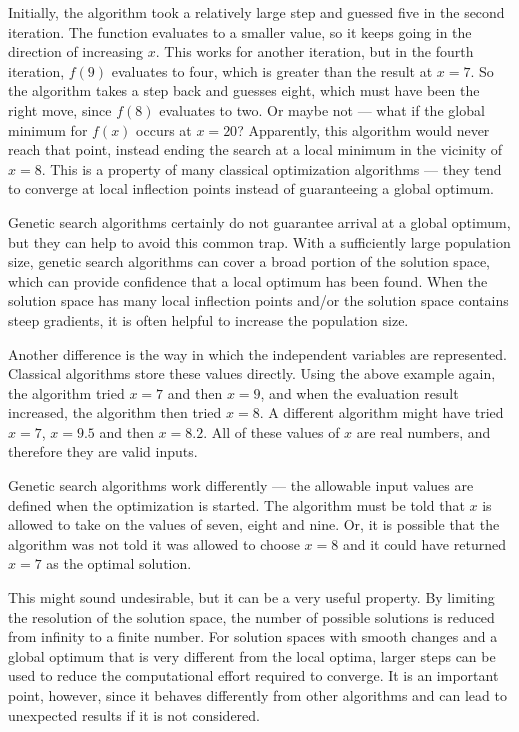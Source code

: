 Initially, the algorithm took a relatively large step and guessed five in the second iteration.  The function evaluates to a smaller value, so it keeps going in the direction of increasing $x$.  This works for another iteration, but in the fourth iteration, $f \left( 9 \right)$ evaluates to four, which is greater than the result at $x=7$.  So the algorithm takes a step back and guesses eight, which must have been the right move, since $f \left( 8 \right)$ evaluates to two.  Or maybe not --- what if the global minimum for $f \left( x \right)$ occurs at $x=20$?  Apparently, this algorithm would never reach that point, instead ending the search at a local minimum in the vicinity of $x=8$.  This is a property of many classical optimization algorithms --- they tend to converge at local inflection points instead of guaranteeing a global optimum.

Genetic search algorithms certainly do not guarantee arrival at a global optimum, but they can help to avoid this common trap.  With a sufficiently large population size, genetic search algorithms can cover a broad portion of the solution space, which can provide confidence that a local optimum has been found.  When the solution space has many local inflection points and/or the solution space contains steep gradients, it is often helpful to increase the population size.

Another difference is the way in which the independent variables are represented.  Classical algorithms store these values directly.  Using the above example again, the algorithm tried $x=7$ and then $x=9$, and when the evaluation result increased, the algorithm then tried $x=8$.  A different algorithm might have tried $x=7$, $x=9.5$ and then $x=8.2$.  All of these values of $x$ are real numbers, and therefore they are valid inputs.

Genetic search algorithms work differently --- the allowable input values are defined when the optimization is started.  The algorithm must be told that $x$ is allowed to take on the values of seven, eight and nine.  Or, it is possible that the algorithm was not told it was allowed to choose $x=8$ and it could have returned $x=7$ as the optimal solution.

This might sound undesirable, but it can be a very useful property.  By limiting the resolution of the solution space, the number of possible solutions is reduced from infinity to a finite number.  For solution spaces with smooth changes and a global optimum that is very different from the local optima, larger steps can be used to reduce the computational effort required to converge.  It is an important point, however, since it behaves differently from other algorithms and can lead to unexpected results if it is not considered.

